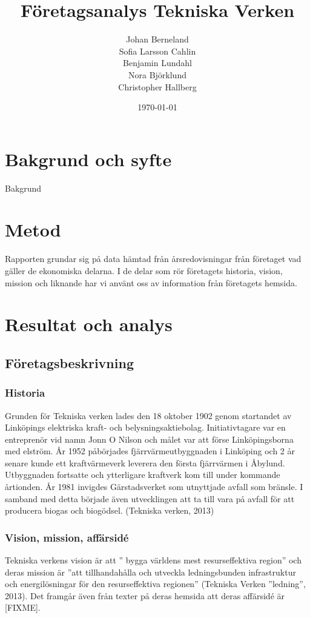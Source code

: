 \documentclass[10pt,a4paper]{article}
\title{Företagsanalys Tekniska Verken}
\author{Johan Berneland\\Sofia Larsson Cahlin\\Benjamin Lundahl\\
    Nora Björklund\\Christopher Hallberg}
\date{\today}
\begin{document}
\maketitle

\newpage

\tableofcontents

\newpage

\section{Bakgrund och syfte}
Bakgrund

\section{Metod}
Rapporten grundar sig på data hämtad från årsredovisningar från företaget vad
gäller de ekonomiska delarna. I de delar som rör företagets historia, vision,
mission och liknande har vi använt oss av information från företagets hemsida.

\section{Resultat och analys}
\subsection{Företagsbeskrivning}

\subsubsection{Historia}
Grunden för Tekniska verken lades den 18 oktober 1902 genom startandet av
Linköpings elektriska kraft- och belysningsaktiebolag. Initiativtagare var en
entreprenör vid namn Jonn O Nilson och målet var att förse Linköpingsborna med
elström. År 1952 påbörjades fjärrvärmeutbyggnaden i Linköping och 2 år senare
kunde ett kraftvärmeverk leverera den första fjärrvärmen i Åbylund. Utbyggnaden
fortsatte och ytterligare kraftverk kom till under kommande årtionden. År 1981 
invigdes Gärstadsverket som utnyttjade avfall som bränsle. I samband med detta
började även utvecklingen att ta till vara på avfall för att producera biogas 
och biogödsel. (Tekniska verken, 2013) 
\subsubsection{Vision, mission, affärsidé}
Tekniska verkens vision är att '' bygga världens mest resurseffektiva
region'' och deras mission är ''att tillhandahålla och utveckla
ledningsbunden infrastruktur och energilösningar för den
resurseffektiva regionen'' (Tekniska Verken ''ledning'', 2013). Det framgår även
från texter på deras hemsida att deras affärsidé är [FIXME].
\end{document}
